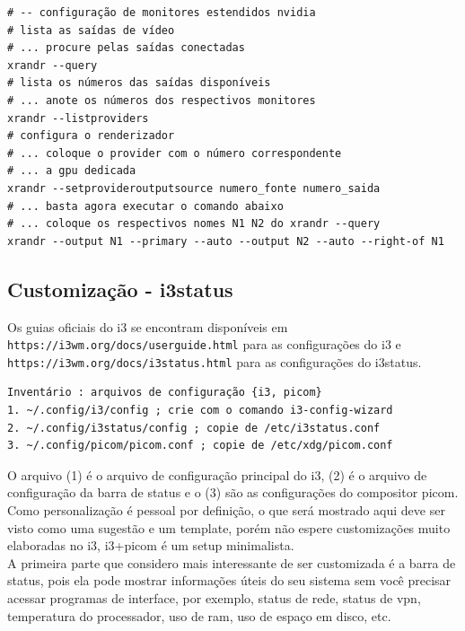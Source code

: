 \documentclass[12pt,a4paper]{article}
\begin{document}
\begin{lstlisting}
# -- configuração de monitores estendidos nvidia 
# lista as saídas de vídeo 
# ... procure pelas saídas conectadas 
xrandr --query
# lista os números das saídas disponíveis 
# ... anote os números dos respectivos monitores
xrandr --listproviders 
# configura o renderizador
# ... coloque o provider com o número correspondente
# ... a gpu dedicada
xrandr --setprovideroutputsource numero_fonte numero_saida
# ... basta agora executar o comando abaixo 
# ... coloque os respectivos nomes N1 N2 do xrandr --query 
xrandr --output N1 --primary --auto --output N2 --auto --right-of N1

\end{lstlisting}

\subsection{Customização - i3status}

\hspace{\baselineskip}

Os guias oficiais do i3 se encontram disponíveis em \texttt{https://i3wm.org/docs/userguide.html} para as configurações do i3 e \texttt{https://i3wm.org/docs/i3status.html} para as configurações do i3status. \\

\begin{lstlisting}
Inventário : arquivos de configuração {i3, picom}
1. ~/.config/i3/config ; crie com o comando i3-config-wizard
2. ~/.config/i3status/config ; copie de /etc/i3status.conf 
3. ~/.config/picom/picom.conf ; copie de /etc/xdg/picom.conf
\end{lstlisting}

\vspace{\baselineskip}

O arquivo (1) é o arquivo de configuração principal do i3, (2) é o arquivo de configuração da barra de status e o (3) são as configurações do compositor picom. Como personalização é pessoal por definição, o que será mostrado aqui deve ser visto como uma sugestão e um template, porém não espere customizações muito elaboradas no i3, i3+picom é um setup minimalista. \\

A primeira parte que considero mais interessante de ser customizada é a barra de status, pois ela pode mostrar informações úteis do seu sistema sem você precisar acessar programas de interface, por exemplo, status de rede, status de vpn, temperatura do processador, uso de ram, uso de espaço em disco, etc.\\
\end{document}
